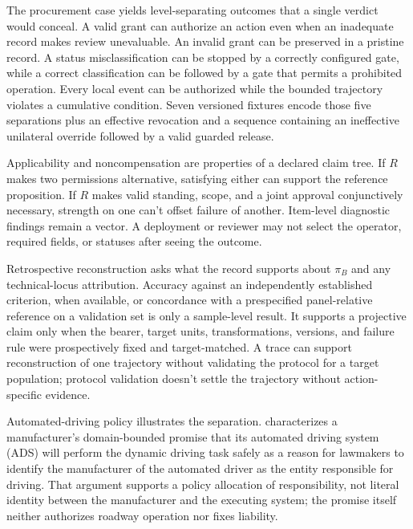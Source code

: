 The procurement case yields level-separating outcomes that a single verdict would conceal. A valid grant can authorize an action even when an inadequate record makes review unevaluable. An invalid grant can be preserved in a pristine record. A status misclassification can be stopped by a correctly configured gate, while a correct classification can be followed by a gate that permits a prohibited operation. Every local event can be authorized while the bounded trajectory violates a cumulative condition. Seven versioned fixtures encode those five separations plus an effective revocation and a sequence containing an ineffective unilateral override followed by a valid guarded release.

Applicability and noncompensation are properties of a declared claim tree. If \(R\) makes two permissions alternative, satisfying either can support the reference proposition. If \(R\) makes valid standing, scope, and a joint approval conjunctively necessary, strength on one can't offset failure of another. Item-level diagnostic findings remain a vector. A deployment or reviewer may not select the operator, required fields, or  statuses after seeing the outcome.

Retrospective reconstruction asks what the record supports about \(\pi_B\) and any technical-locus attribution. Accuracy against an independently established criterion, when available, or concordance with a prespecified panel-relative reference on a validation set is only a sample-level result. It supports a projective claim only when the bearer, target units, transformations, versions, and failure rule were prospectively fixed and target-matched. A trace can support reconstruction of one trajectory without validating the protocol for a target population; protocol validation doesn't settle the trajectory without action-specific evidence.

Automated-driving policy illustrates the separation. \Textcite{hinkle2020autonomousVehiclesTestimony} characterizes a manufacturer's domain-bounded promise that its automated driving system (ADS) will perform the dynamic driving task safely as a reason for lawmakers to identify the manufacturer of the automated driver as the entity responsible for driving. That argument supports a policy allocation of responsibility, not literal identity between the manufacturer and the executing system; the promise itself neither authorizes roadway operation nor fixes liability.

